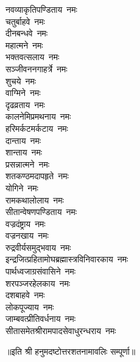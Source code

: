 \begin{multicols}{2}
\begin{flushleft}
नवव्याकृतिपण्डिताय~नमः\\
चतुर्बाहवे~नमः\\
दीनबन्धवे~नमः\\
महात्मने~नमः\\
भक्तवत्सलाय~नमः\\
सञ्जीवननगाहर्त्रे~नमः\\
शुचये~नमः\\
वाग्मिने~नमः\\
दृढव्रताय~नमः\\
कालनेमिप्रमथनाय~नमः\hfill{}\\
हरिमर्कटमर्कटाय~नमः\\
दान्ताय~नमः\\
शान्ताय~नमः\\
प्रसन्नात्मने~नमः\\
शतकण्ठमदापहृते~नमः\\
योगिने~नमः\\
रामकथालोलाय~नमः\\
सीतान्वेषणपण्डिताय~नमः\\
वज्रदंष्ट्राय~नमः\\
वज्रनखाय~नमः\hfill{}\\
रुद्रवीर्यसमुद्भवाय~नमः\\
इन्द्रजित्प्रहितामोघ\-ब्रह्मास्त्रविनिवारकाय~नमः\\
पार्थध्वजाग्रसंवासिने~नमः\\
शरपञ्जरहेलकाय~नमः\\
दशबाहवे~नमः\\
लोकपूज्याय~नमः\\
जाम्बवत्प्रीतिवर्धनाय~नमः\\
सीतासमेतश्रीराम\-पादसेवाधुरन्धराय~नमः\\
\end{flushleft}
\end{multicols}
॥इति श्री हनुमदष्टोत्तरशतनामावलिः सम्पूर्णा॥
